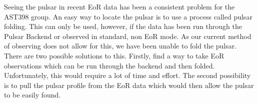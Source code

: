 \documentclass[a4paper,12pt]{article}
\begin{document}
                                                                                                                                                                                                                                                                                                                                                                                                                                                                                                                                                                                                                                                                                                                                                                                                                                                                                                                                                                                                                                                                                                                                                                                                                                                                                                                                                                                                                                                                                                                                                                         Seeing the pulsar in recent EoR data has been a consistent problem for the AST398 group. An easy way to locate the pulsar is to use a process called pulsar folding. This can only be used, however, if the data has been run through the Pulsar Backend or observed in standard, non EoR mode. As our current method of observing does not allow for this, we have been unable to fold the pulsar. There are two possible solutions to this. Firstly, find a way to take EoR observations which can be run through the backend and then folded. Unfortunately, this would require a lot of time and effort. The second possibility is to pull the pulsar profile from the EoR data which would then allow the pulsar to be easily found. 
\end{document}
